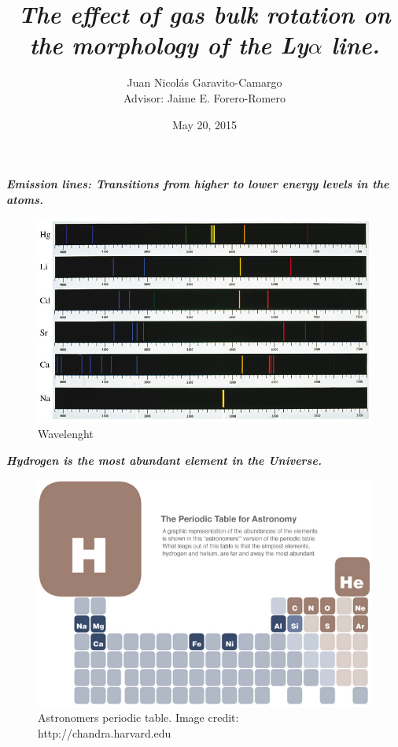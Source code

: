 \documentclass{beamer}
\title{\textit{\textbf{The effect of gas bulk rotation on the morphology of the Ly$\alpha$ line.}}}
\author{Juan Nicol\'as Garavito-Camargo \\ Advisor: Jaime E. Forero-Romero}
\institute{Universidad de los Andes, Bogot\'a, Colombia}
\date{May 20, 2015}
\begin{document}

\begin{frame}{\textit{\textbf{Emission lines: Transitions from higher to lower energy levels in the atoms.}}}
\begin{figure}
\includegraphics[scale=0.35]{Figures/emission.jpg}
\caption*{Wavelenght}
\end{figure}
\end{frame}

\begin{frame}{\textit{\textbf{Hydrogen is the most abundant element in the Universe.}}}
\begin{figure}
\includegraphics[scale=0.3]{Figures/astronomy_table.jpg}
\caption{Astronomers periodic table. Image credit: http://chandra.harvard.edu}
\end{figure}
\end{frame}
\end{document}
